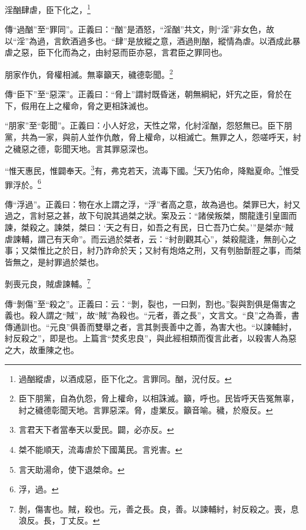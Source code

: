 淫酗肆虐，臣下化之，\footnote{過酗縱虐，以酒成惡，臣下化之。言罪同。酗，況付反。}

{\noindent\zhuan{}\fzbyks 傳“過酗”至“罪同”。正義曰：“酗”是酒怒，“淫酗”共文，則“淫”非女色，故以“淫”為過，言飲酒過多也。“肆”是放縱之意，酒過則酗，縱情為虐。以酒成此暴虐之惡，臣下化而為之，由紂惡而臣亦惡，言君臣之罪同也。 \par}

朋家作仇，脅權相滅。無辜籲天，穢德彰聞。\footnote{臣下朋黨，自為仇怨，脅上權命，以相誅滅。籲，呼也。民皆呼天告冤無辜，紂之穢德彰聞天地。言罪惡深。脅，虛業反。籲音喻。穢，於廢反。}

{\noindent\zhuan{}\fzbyks 傳“臣下”至“惡深”。正義曰：“脅上”謂紂既昏迷，朝無綱紀，奸宄之臣，脅於在下，假用在上之權命，脅之更相誅滅也。 \par}

{\noindent\shu{}\fzkt “朋家”至“彰聞”。正義曰：小人好忿，天性之常，化紂淫酗，怨怒無已。臣下朋黨，共為一家，與前人並作仇敵，脅上權命，以相滅亡。無罪之人，怨嗟呼天，紂之穢惡之德，彰聞天地。言其罪惡深也。 \par}

“惟天惠民，惟闢奉天。\footnote{言君天下者當奉天以愛民。闢，必亦反。}有，弗克若天，流毒下國。\footnote{桀不能順天，流毒虐於下國萬民。言兇害。}天乃佑命，降黜夏命。\footnote{言天助湯命，使下退桀命。}惟受罪浮於。\footnote{浮，過。}

{\noindent\zhuan{}\fzbyks 傳“浮過”。正義曰：物在水上謂之浮，“浮”者高之意，故為過也。桀罪已大，紂又過之，言紂惡之甚，故下句說其過桀之狀。案及云：“諸侯叛桀，關龍逢引皇圖而諫，桀殺之。諫桀，桀曰：‘天之有日，如吾之有民，日亡吾乃亡矣。’”是桀亦“賊虐諫輔，謂己有天命”。而云過於桀者，云：“紂剖觀其心”，桀殺龍逢，無剖心之事；又桀惟比之於日，紂乃詐命於天；又紂有炮烙之刑，又有刳胎斮脛之事，而桀皆無之，是紂罪過於桀也。 \par}

剝喪元良，賊虐諫輔。\footnote{剝，傷害也。賊，殺也。元，善之長。良，善。以諫輔紂，紂反殺之。喪，息浪反。長，丁丈反。}

{\noindent\zhuan{}\fzbyks 傳“剝傷”至“殺之”。正義曰：云：“剝，裂也，一曰剝，割也。”裂與割俱是傷害之義也。殺人謂之“賊”，故“賊”為殺也。“元者，善之長”，文言文。“良”之為善，書傳通訓也。“元良”俱善而雙舉之者，言其剝喪善中之善，為害大也。“以諫輔紂，紂反殺之”，即是也。上篇言“焚炙忠良”，與此經相類而復言此者，以殺害人為惡之大，故重陳之也。 \par}

